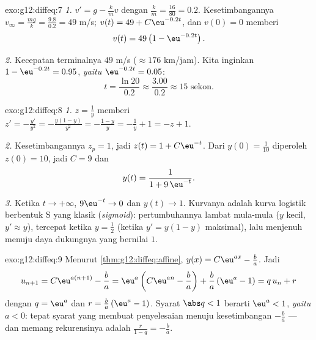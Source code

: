 \begin{solution}{exo:g12:diffeq:7}
\emph{1.} $v' = g - \frac{k}{m} v$ dengan $\frac km = \frac{16}{80} = 0.2$.
Kesetimbangannya $v_\infty = \frac{mg}{k} = \frac{9.8}{0.2} = 49$ m/s;
$v(t) = 49 + C\eu^{-0.2t}$, dan $v(0) = 0$ memberi
\[
v(t) = 49\left(1 - \eu^{-0.2 t}\right).
\]

\emph{2.} Kecepatan terminalnya $49$ m/s ($\approx 176$ km/jam). Kita
inginkan $1 - \eu^{-0.2t} = 0.95$, \emph{yaitu} $\eu^{-0.2t} = 0.05$:
\[
t = \frac{\ln 20}{0.2} \approx \frac{3.00}{0.2} \approx 15 \text{ sekon}.
\]
\end{solution}

\begin{solution}{exo:g12:diffeq:8}
\emph{1.} $z = \frac1y$ memberi $z' = -\frac{y'}{y^2}
= -\frac{y(1-y)}{y^2} = -\frac{1-y}{y} = -\frac1y + 1 = -z + 1$.

\emph{2.} Kesetimbangannya $z_p = 1$, jadi $z(t) = 1 + C\eu^{-t}$. Dari
$y(0) = \frac{1}{10}$ diperoleh $z(0) = 10$, jadi $C = 9$ dan
\[
y(t) = \frac{1}{1 + 9\,\eu^{-t}} .
\]

\emph{3.} Ketika $t \to +\infty$, $9\eu^{-t} \to 0$ dan $y(t) \to 1$. Kurvanya
adalah kurva logistik berbentuk S yang klasik (\emph{sigmoid}): pertumbuhannya
lambat mula-mula ($y$ kecil, $y' \approx y$), tercepat ketika $y = \frac12$
(ketika $y' = y(1-y)$ maksimal), lalu menjenuh menuju daya dukungnya
yang bernilai $1$.
\end{solution}

\begin{solution}{exo:g12:diffeq:9}
Menurut \cref{thm:g12:diffeq:affine}, $y(x) = C\eu^{ax} - \frac ba$. Jadi
\[
u_{n+1} = C\eu^{a(n+1)} - \frac ba
= \eu^{a}\left(C\eu^{an} - \frac ba\right) + \frac ba\left(\eu^a - 1\right)
= q\,u_n + r
\]
dengan $q = \eu^{a}$ dan $r = \frac{b}{a}\left(\eu^{a} - 1\right)$.
Syarat $\abs q < 1$ berarti $\eu^a < 1$, \emph{yaitu} $a < 0$: tepat
syarat yang membuat penyelesaian 
menuju kesetimbangan $-\frac ba$ --- dan memang 
rekurensinya adalah $\frac{r}{1 - q} = -\frac{b}{a}$.
\end{solution}

